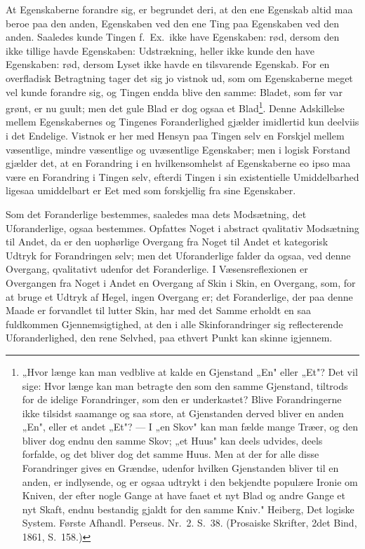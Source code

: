 \documentclass[12pt]{book}
\newcommand{\opage}[1]{\marginnote{\footnotesize\textit{[#1]}}}
\begin{document}
At Egenskaberne forandre sig, er begrundet deri, at den ene Egenskab altid maa beroe
paa den anden, Egenskaben ved den ene Ting paa Egenskaben ved den anden. Saaledes
kunde Tingen f.\ Ex.\ ikke have Egenskaben: rød, dersom den ikke tillige havde
Egenskaben: Udstrækning, heller ikke kunde den have Egenskaben: rød, dersom Lyset ikke
havde en tilsvarende Egenskab. For en overfladisk Betragtning tager det sig jo vistnok
ud, som om Egenskaberne meget vel kunde forandre sig, og Tingen endda blive den samme:
Bladet, som før var grønt, er nu guult; men det gule Blad er dog ogsaa et
Blad\footnote{„Hvor længe kan man vedblive at kalde en Gjenstand „En" eller „Et"? Det
vil sige: Hvor længe kan man betragte den som den samme Gjenstand, tiltrods for de
idelige Forandringer, som den er underkastet? Blive Forandringerne ikke tilsidst
saamange og saa store, at Gjenstanden derved bliver en anden „En", eller et andet
„Et"? --- I „en Skov" kan man fælde mange Træer, og den bliver dog endnu den samme
Skov; „et Huus" kan deels udvides, deels forfalde, og det bliver dog det samme Huus.
Men at der for alle disse Forandringer gives en Grændse, udenfor hvilken Gjenstanden
bliver til en anden, er indlysende, og er ogsaa udtrykt i den bekjendte populære
Ironie om Kniven, der efter nogle Gange at have faaet et nyt Blad og andre Gange et
nyt Skaft, endnu bestandig gjaldt for den samme Kniv." Heiberg, Det logiske System.
Første Afhandl. Perseus. Nr.\ 2. S.~38. (Prosaiske Skrifter, 2det Bind, 1861, S.~158.)}.
Denne Adskillelse mellem Egenskabernes og Tingenes Foranderlighed gjælder imidlertid
kun deelviis i det Endelige. Vistnok er her med Hensyn paa Tingen selv en Forskjel
mellem væsentlige, mindre væsentlige og uvæsentlige Egenskaber; men i logisk Forstand
gjælder det, at en Forandring i en hvilkensomhelst af Egenskaberne eo ipso maa være en
Forandring i Tingen selv, efterdi Tingen i sin existentielle Umiddelbarhed
\opage{108} ligesaa umiddelbart er Eet med som forskjellig fra sine Egenskaber.

Som det Foranderlige bestemmes, saaledes maa dets Modsætning, det Uforanderlige, ogsaa
bestemmes. Opfattes Noget i abstract qvalitativ Modsætning til Andet, da er den
uophørlige Overgang fra Noget til Andet et kategorisk Udtryk for Forandringen selv;
men det Uforanderlige falder da ogsaa, ved denne Overgang, qvalitativt udenfor det
Foranderlige. I Væsensreflexionen er Overgangen fra Noget i Andet en Overgang af Skin
i Skin, en Overgang, som, for at bruge et Udtryk af Hegel, ingen Overgang er; det
Foranderlige, der paa denne Maade er forvandlet til lutter Skin, har med det Samme
erholdt en saa fuldkommen Gjennemsigtighed, at den i alle Skinforandringer sig
reflecterende Uforanderlighed, den rene Selvhed, paa ethvert Punkt kan skinne
igjennem.
\end{document}
